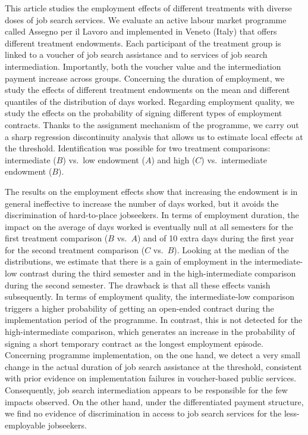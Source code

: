 \documentclass[
  11pt]{article}
\begin{document}
This article studies the employment effects of different treatments with
diverse doses of job search services. We evaluate an active labour
market programme called Assegno per il Lavoro and implemented in Veneto
(Italy) that offers different treatment endowments. Each participant of
the treatment group is linked to a voucher of job search assistance and
to services of job search intermediation. Importantly, both the voucher
value and the intermediation payment increase across groups. Concerning
the duration of employment, we study the effects of different treatment
endowments on the mean and different quantiles of the distribution of
days worked. Regarding employment quality, we study the effects on the
probability of signing different types of employment contracts. Thanks
to the assignment mechanism of the programme, we carry out a sharp
regression discontinuity analysis that allows us to estimate local
effects at the threshold. Identification was possible for two treatment
comparisons: intermediate (\(B\)) vs.~low endowment (\(A\)) and high
(\(C\)) vs.~intermediate endowment (\(B\)).

The results on the employment effects show that increasing the endowment
is in general ineffective to increase the number of days worked, but it
avoids the discrimination of hard-to-place jobseekers. In terms of
employment duration, the impact on the average of days worked is
eventually null at all semesters for the first treatment comparison
(\(B\) vs.~\(A\)) and of 10 extra days during the first year for the
second treatment comparison (\(C\) vs.~\(B\)). Looking at the median of
the distributions, we estimate that there is a gain of employment in the
intermediate-low contrast during the third semester and in the
high-intermediate comparison during the second semester. The drawback is
that all these effects vanish subsequently. In terms of employment
quality, the intermediate-low comparison triggers a higher probability
of getting an open-ended contract during the implementation period of
the programme. In contrast, this is not detected for the
high-intermediate comparison, which generates an increase in the
probability of signing a short temporary contract as the longest
employment episode. Concerning programme implementation, on the one
hand, we detect a very small change in the actual duration of job search
assistance at the threshold, consistent with prior evidence on
implementation failures in voucher-based public services. Consequently,
job search intermediation appears to be responsible for the few impacts
observed. On the other hand, under the differentiated payment structure,
we find no evidence of discrimination in access to job search services
for the less-employable jobseekers.
\end{document}
